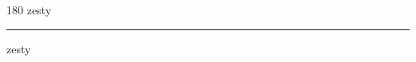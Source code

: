 
\begin{frame}
\begin{center}
\begin{turn}{180}
{\fontsize{2.5cm}{1em}\selectfont zesty}
\end{turn}
\vspace{1em}\par  
\hrule
\vspace{1em}\par  
{\fontsize{2.5cm}{1em}\selectfont zesty}
\end{center}
\end{frame}
